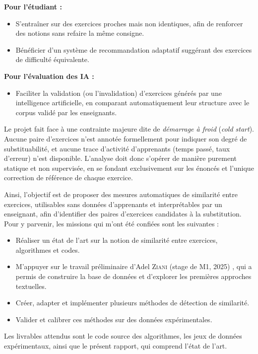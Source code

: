 \documentclass[12pt,a4paper,oneside]{report}
\begin{document}
\textbf{Pour l'étudiant :}
\begin{itemize}
    \item S'entraîner sur des exercices proches mais non identiques, afin de renforcer des notions sans refaire la même consigne.
    \item Bénéficier d'un système de recommandation adaptatif suggérant des exercices de difficulté équivalente.
\end{itemize}

\textbf{Pour l'évaluation des IA :}
\begin{itemize}
    \item Faciliter la validation (ou l'invalidation) d'exercices générés par une intelligence artificielle, en comparant automatiquement leur structure avec le corpus validé par les enseignants.
\end{itemize}

Le projet fait face à une contrainte majeure dite de \emph{démarrage à froid} (\emph{cold start}). Aucune paire d'exercices n'est annotée formellement pour indiquer son degré de substituabilité, et aucune trace d'activité d'apprenants (temps passé, taux d'erreur) n'est disponible. L'analyse doit donc s'opérer de manière purement statique et non supervisée, en se fondant exclusivement sur les énoncés et l'unique correction de référence de chaque exercice.

Ainsi, l'objectif est de proposer des mesures automatiques de
similarité entre exercices, utilisables sans données d'apprenants et
interprétables par un enseignant, afin d'identifier des paires
d'exercices candidates à la substitution.
Pour y parvenir, les missions
qui m'ont été confiées sont les suivantes :
\begin{itemize}
    \item Réaliser un état de l'art sur la notion de similarité entre exercices,
     algorithmes et codes.
    \item M'appuyer sur le travail préliminaire d'Adel \textsc{Ziani} (stage de M1, 2025) \cite{ziani_detection_2025}, qui a permis de construire la base de données et d'explorer les premières approches textuelles.
    \item Créer, adapter et implémenter plusieurs méthodes de détection de similarité.
    \item Valider et calibrer ces méthodes sur des données expérimentales.
\end{itemize}

Les livrables attendus sont le code source des algorithmes, les jeux de
 données expérimentaux, ainsi que le présent rapport, qui comprend l'état de l'art.
\end{document}
